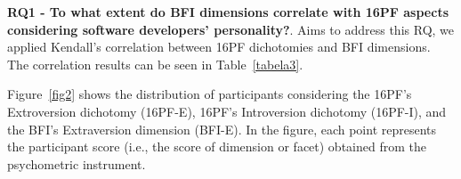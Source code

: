 \textbf{RQ1 - To what extent do BFI dimensions correlate with 16PF aspects considering software developers’ personality?}. Aims to address this RQ, we applied Kendall’s correlation between 16PF dichotomies and BFI dimensions. The correlation results can be seen in Table~\ref{tabela3}.

\begin{table}[!h]
\centering
\caption{Correlation between 16PF Dichotomies
 and BFI Dimensions.}
\label{tabela3}
\end{table}

Figure~\ref{fig2} shows the distribution of participants considering the 16PF's Extroversion dichotomy (16PF-E), 16PF's Introversion dichotomy (16PF-I), and the  BFI's Extraversion dimension (BFI-E). In the figure, each point represents the participant score (i.e., the score of dimension or facet) obtained from the psychometric instrument.

